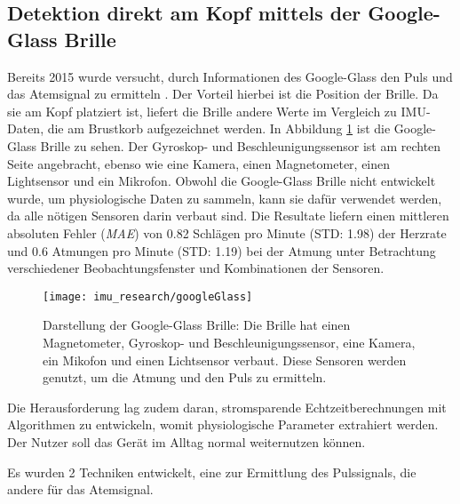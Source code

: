\subsection{Detektion direkt am Kopf mittels der Google-Glass Brille}
Bereits 2015 wurde versucht, durch Informationen des Google-Glass den Puls und das Atemsignal zu ermitteln \cite{hernandezCardiacRespiratoryParameter}. 
Der Vorteil hierbei ist die Position der Brille. 
Da sie am Kopf platziert ist, liefert die Brille andere Werte im Vergleich zu IMU-Daten, die am Brustkorb aufgezeichnet werden.
In Abbildung \ref{imu_research_google_glass} ist die Google-Glass Brille zu sehen.
Der Gyroskop- und Beschleunigungssensor ist am rechten Seite angebracht, ebenso wie eine Kamera, einen Magnetometer, einen Lightsensor und ein Mikrofon. 
Obwohl die Google-Glass Brille nicht entwickelt wurde, um physiologische Daten zu sammeln, kann sie dafür verwendet werden, da alle nötigen Sensoren darin verbaut sind.
Die Resultate liefern einen mittleren absoluten Fehler (\textit{MAE}) von 0.82 Schlägen pro Minute (STD: 1.98) der Herzrate und 0.6 Atmungen pro Minute (STD: 1.19) bei der Atmung unter Betrachtung verschiedener Beobachtungsfenster und Kombinationen der Sensoren. 

\begin{figure}[ht]
    \centering
    \texttt{[image: imu\_research/googleGlass]}
    \caption{Darstellung der Google-Glass Brille: Die Brille hat einen Magnetometer, Gyroskop- und Beschleunigungssensor, eine Kamera, ein Mikofon und einen Lichtsensor verbaut. Diese Sensoren werden genutzt, um die Atmung und den Puls zu ermitteln. \cite{hernandezCardiacRespiratoryParameter}}
    \label{imu_research_google_glass}
\end{figure}
Die Herausforderung lag zudem daran, stromsparende Echtzeitberechnungen mit Algorithmen zu entwickeln, womit physiologische Parameter extrahiert werden. Der Nutzer soll das Gerät im Alltag normal weiternutzen können. 

Es wurden 2 Techniken entwickelt, eine zur Ermittlung des Pulssignals, die andere für das Atemsignal.
